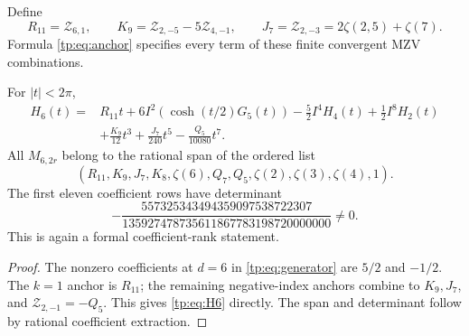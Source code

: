 Define
\begin{equation}\label{tp:eq:new6}
 R_{11}=\mathcal Z_{6,1},\qquad
 K_9=\mathcal Z_{2,-5}-5\mathcal Z_{4,-1},\qquad
 J_7=\mathcal Z_{2,-3}=2\zeta(2,5)+\zeta(7).
\end{equation}
Formula \eqref{tp:eq:anchor} specifies every term of these finite
convergent MZV combinations.

\begin{theorem}
\label{tp:thm:six}
For $|t|<2\pi$,
\begin{equation}\label{tp:eq:H6}
 \boxed{\begin{aligned}
 H_6(t)={}&R_{11}t+6I^2(\cosh(t/2)G_5(t))
          -\frac52I^4H_4(t)+\frac12I^8H_2(t)\\
         &+\frac{K_9}{12}t^3+\frac{J_7}{240}t^5
          -\frac{Q_5}{10080}t^7.
 \end{aligned}}
\end{equation}
All $M_{6,2r}$ belong to the rational span of the ordered list
\begin{equation}\label{tp:eq:space6}
 (R_{11},K_9,J_7,K_8,\zeta(6),Q_7,Q_5,
                       \zeta(2),\zeta(3),\zeta(4),1).
\end{equation}
The first eleven coefficient rows have determinant
\begin{equation}\label{tp:eq:rank6}
 -\frac{557325343494359097538722307}
         {135927478735611867783198720000000}\ne0.
\end{equation}
This is again a formal coefficient-rank statement.
\end{theorem}

\begin{proof}
The nonzero coefficients at $d=6$ in \eqref{tp:eq:generator} are
$5/2$ and $-1/2$.  The $k=1$ anchor is $R_{11}$; the remaining
negative-index anchors combine to $K_9,J_7$, and
$\mathcal Z_{2,-1}=-Q_5$.  This gives \eqref{tp:eq:H6} directly.
The span and determinant follow by rational coefficient extraction.
\end{proof}

